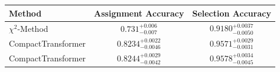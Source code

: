     \begin{tabular}{lcc}
        \toprule
        Method & Assignment Accuracy & Selection Accuracy \\
        \midrule
        $\chi^2$-Method & $0.731_{-0.007}^{+0.006}$ & $0.9180_{-0.0050}^{+0.0037}$ \\
        CompactTransformer & $0.8234_{-0.0046}^{+0.0022}$ & $0.9571_{-0.0031}^{+0.0029}$ \\
        CompactTransformer & $0.8244_{-0.0042}^{+0.0029}$ & $0.9578_{-0.0045}^{+0.0034}$ \\
        \bottomrule
    \end{tabular}